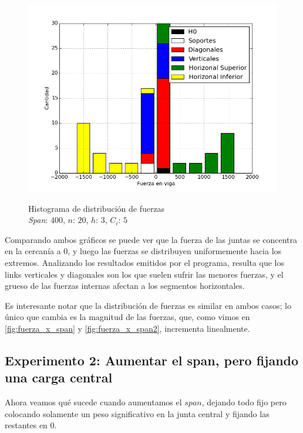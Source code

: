 \begin{figure}[h!]
\begin{center}
\includegraphics[scale=0.5]{archivos/graficos/hist_400.png}\\
\caption{\label{fig:hist_fuerzas2}Histograma de distribución de fuerzas\\
\textit{Span}: $400$, $n$: $20$, $h$: $3$, $C_i$: $5$}
\end{center}
\end{figure}

Comparando ambos gráficos se puede ver que la fuerza de las juntas se concentra
en la cercanía a $0$, y luego las fuerzas se distribuyen uniformemente hacia los extremos. Analizando los resultados emitidos por el programa, resulta que los links verticales y diagonales son los que suelen sufrir las menores fuerzas, y el grueso de las fuerzas internas afectan a los segmentos horizontales.

Es interesante notar que la distribución de fuerzas es similar en ambos casos; lo único que cambia es la magnitud de las fuerzas, que, como vimos en \ref{fig:fuerza_x_span} y \ref{fig:fuerza_x_span2}, incrementa linealmente.

\subsection{Experimento 2: Aumentar el span, pero fijando una carga central}

Ahora veamos qué sucede cuando aumentamos el $span$, dejando todo fijo pero
 colocando solamente un peso significativo en la junta central y fijando las restantes en $0$.\\

